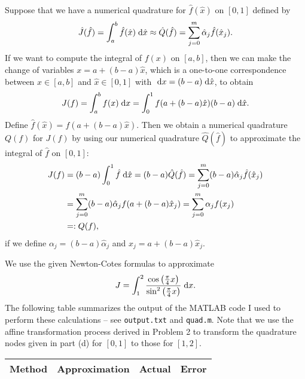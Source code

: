 \documentclass{homework}
\begin{document}
	\question
	Suppose that we have a numerical quadrature for $\hat{f}(\hat{x})$ on $[0,1]$ defined by
	\begin{equation}
		\hat{J}(\hat{f}) = \int_a^b \hat{f}(\hat{x})\;\text{d}\hat{x} \approx \hat{Q}(\hat{f}) = \sum_{j=0}^m \hat{\alpha}_j \hat{f}(\hat{x}_j).
	\end{equation}
	If we want to compute the integral of $f(x)$ on $[a,b]$, then we can make the change of variables $x = a + (b-a)\hat{x}$, which is a one-to-one correspondence between $x \in [a,b]$ and $\hat{x} \in [0,1]$ with $\;\text{d} x = (b-a)\;\text{d}\hat{x}$, to obtain
	\begin{equation}
		J(f) = \int_a^bf(x)\;\text{d} x = \int_0^1 f(a + (b-a)\hat{x})(b-a)\;\text{d}\hat{x}.
	\end{equation}
	Define $\hat{f}(\hat{x}) = f(a+(b-a)\hat{x})$. Then we obtain a numerical quadrature $Q(f)$ for $J(f)$ by using our numerical quadrature $\hat{Q}(\hat{f})$ to approximate the integral of $\hat{f}$ on $[0,1]$:
	\begin{align}
		J(f) &= (b-a)\int_0^1\hat{f}\;\text{d}\hat{x} = (b-a)\hat{Q}(\hat{f}) = \sum_{j=0}^m (b-a)\hat{\alpha}_j \hat{f}(\hat{x}_j) \\
		&= \sum_{j=0}^m (b-a)\hat{\alpha}_jf(a+(b-a)\hat{x}_j) = \sum_{j=0}^m \alpha_jf(x_j) \\
		&=: Q(f),
	\end{align}
	if we define $\alpha_j = (b-a)\hat{\alpha}_j$ and $x_j = a + (b-a)\hat{x}_j$.
	
	\question 
	We use the given Newton-Cotes formulas to approximate
	\begin{equation}
		J = \int_1^2\frac{\cos\left(\frac{\pi}{4}x\right)}{\sin^2\left(\frac{\pi}{4}x\right)}\;\text{d} x.
	\end{equation}
	The following table summarizes the output of the MATLAB code I used to perform these calculations -- see \verb*|output.txt| and \verb*|quad.m|. Note that we use the affine transformation process derived in Problem 2 to transform the quadrature nodes given in part (d) for $[0,1]$ to those for $[1,2]$.
	\begin{table}[H]
		\begin{tabular}{@{}llll@{}}
			\toprule
			Method & Approximation & Actual & Error \\
			\midrule
			
			\bottomrule
		\end{tabular}
	\end{table}
\end{document}
